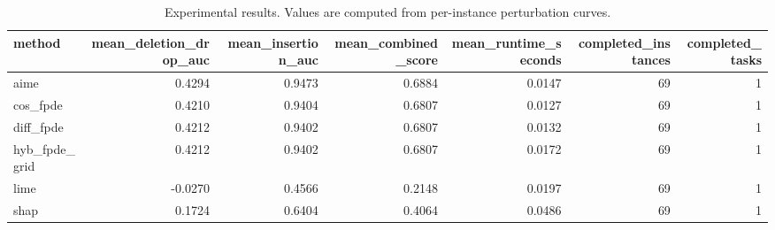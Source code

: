 \begin{table}[t]
\caption{Experimental results. Values are computed from per-instance perturbation curves.}
\label{tab:main_results_computed}
\centering
\begin{tabular}{lrrrrrr}
\toprule
method & mean\_deletion\_drop\_auc & mean\_insertion\_auc & mean\_combined\_score & mean\_runtime\_seconds & completed\_instances & completed\_tasks \\
\midrule
aime & 0.4294 & 0.9473 & 0.6884 & 0.0147 & 69 & 1 \\
cos\_fpde & 0.4210 & 0.9404 & 0.6807 & 0.0127 & 69 & 1 \\
diff\_fpde & 0.4212 & 0.9402 & 0.6807 & 0.0132 & 69 & 1 \\
hyb\_fpde\_grid & 0.4212 & 0.9402 & 0.6807 & 0.0172 & 69 & 1 \\
lime & -0.0270 & 0.4566 & 0.2148 & 0.0197 & 69 & 1 \\
shap & 0.1724 & 0.6404 & 0.4064 & 0.0486 & 69 & 1 \\
\bottomrule
\end{tabular}

\end{table}
